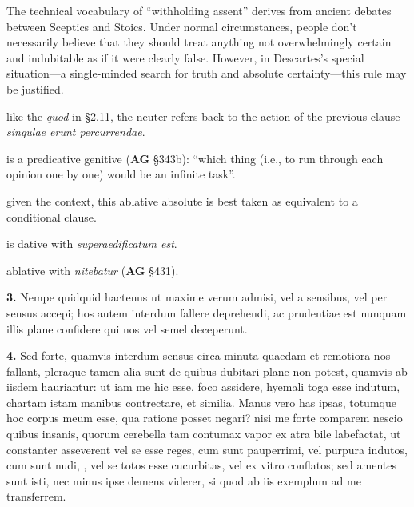  The technical vocabulary of ``withholding assent'' derives from ancient debates between Sceptics and Stoics. Under normal circumstances, people don't necessarily believe that they should treat anything not overwhelmingly certain and indubitable as if it were clearly false. However, in Descartes's special situation---a single-minded search for truth and absolute certainty---this rule may be justified.

 like the \textit{quod} in §2.11, the neuter refers back to the action of the previous clause \textit{singulae erunt percurrendae}.

 is a predicative genitive (\textbf{AG} §343b): ``which thing (i.e., to run through each opinion one by one) would be an infinite task''.

 given the context, this ablative absolute is best taken as equivalent to a conditional clause.

 is dative with \textit{superaedificatum est}.

 ablative with \textit{nitebatur} (\textbf{AG} §431).


\clearpage

\beginnumbering
\pstart
\begin{latin}
    \textenglish{\textbf{3.}} Nempe quidquid hactenus ut maxime verum admisi, vel a sensibus, vel per sensus accepi; hos autem interdum fallere deprehendi, ac prudentiae est nunquam illis plane confidere qui nos vel semel deceperunt.
\end{latin}
\pend
\endnumbering

\beginnumbering
\pstart
\begin{latin}
    \textenglish{\textbf{4.}} Sed forte, quamvis interdum sensus circa minuta quaedam et remotiora nos fallant, pleraque tamen alia sunt de quibus dubitari plane non potest, quamvis ab iisdem hauriantur: ut iam me hic esse, foco assidere, hyemali toga esse indutum, chartam istam manibus contrectare, et similia. Manus vero has ipsas, totumque hoc corpus meum esse, qua ratione posset negari? nisi me forte comparem nescio quibus insanis, quorum cerebella tam contumax vapor ex atra bile labefactat, ut constanter asseverent vel se esse reges, cum sunt pauperrimi, vel purpura indutos, cum sunt nudi, , vel se totos esse cucurbitas, vel ex vitro conflatos; sed amentes sunt isti, nec minus ipse demens viderer, si quod ab iis exemplum ad me transferrem.
\end{latin}
\pend
\endnumbering

